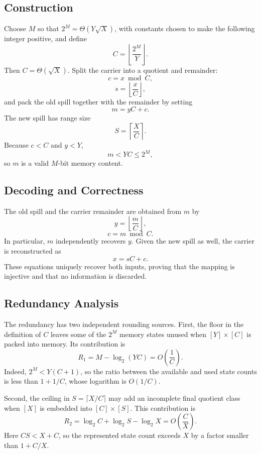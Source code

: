 \subsection{Construction}

Choose \(M\) so that \(2^M=\Theta(Y\sqrt X)\), with constants chosen to make
the following integer positive, and define
\[
    C=
    \left\lfloor
    \frac{2^M}{Y}
    \right\rfloor.
\]
Then \(C=\Theta(\sqrt X)\). Split the carrier into a quotient and remainder:
\[
    c=x\bmod C,
\]
\[
    s=\left\lfloor\frac{x}{C}\right\rfloor,
\]
and pack the old spill together with the remainder by setting
\[
    m=yC+c.
\]
The new spill has range size
\[
    S=
    \left\lceil
    \frac{X}{C}
    \right\rceil.
\]
Because \(c<C\) and \(y<Y\),
\[
    m<YC\leq2^M,
\]
so \(m\) is a valid \(M\)-bit memory content.

\subsection{Decoding and Correctness}

The old spill and the carrier remainder are obtained from \(m\) by
\[
    y=
    \left\lfloor
    \frac{m}{C}
    \right\rfloor,
\]
\[
    c=m\bmod C.
\]
In particular, \(m\) independently recovers \(y\). Given the new spill as
well, the carrier is reconstructed as
\[
    x=sC+c.
\]
These equations uniquely recover both inputs, proving that the mapping is
injective and that no information is discarded.

\subsection{Redundancy Analysis}

The redundancy has two independent rounding sources. First, the floor in
the definition of \(C\) leaves some of the \(2^M\) memory states unused when
\([Y]\times[C]\) is packed into memory. Its contribution is
\[
    R_1
    =M-\log_2(YC)
    =O\left(\frac{1}{C}\right).
\]
Indeed, \(2^M<Y(C+1)\), so the ratio between the available and used state
counts is less than \(1+1/C\), whose logarithm is \(O(1/C)\).

Second, the ceiling in
\(S=\lceil X/C\rceil\) may add an incomplete final quotient class when
\([X]\) is embedded into \([C]\times[S]\). This contribution is
\[
    R_2
    =\log_2 C
    +\log_2 S
    -\log_2 X
    =O\left(\frac{C}{X}\right).
\]
Here \(CS<X+C\), so the represented state count exceeds \(X\) by a factor
smaller than \(1+C/X\).

